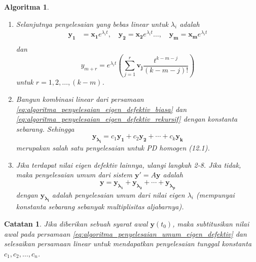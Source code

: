 \documentclass[a4paper]{article}
\theoremstyle{definisi}
\newtheorem{algoritma}{Algoritma}[section]
\newtheorem{catatan}{Catatan}[section]
\numberwithin{equation}{section}
\begin{document}
\begin{algoritma}
\begin{enumerate}[label=Langkah \arabic*: ,leftmargin=*]
    \item Selanjutnya penyelesaian yang bebas linear untuk $\lambda_i$ adalah
    \begin{equation}\label{eq:algoritma_penyelesaian_eigen_defektiv_biasa}
      \begin{split}
        \mathbf{y_1}&=\mathbf{x_1}e^{\lambda_it},\quad \mathbf{y_2}=\mathbf{x_2}e^{\lambda_it}
        \dots,\quad\mathbf{y_{m}}=\mathbf{x_m}e^{\lambda_it}\\
      \end{split}
    \end{equation}
    dan
    \begin{equation}\label{eq:algoritma_penyelesaian_eigen_defektiv_rekursif}
      y_{m+r}=e^{\lambda_it}\left(\sum_{j=1}^{r} \mathbf{v_{j}}\frac{t^{k-m-j}}{(k-m-j)!}\right)
    \end{equation}
    untuk $r=1,2,\ldots,(k-m)$.
    \item Bangun kombinasi linear dari persamaan \eqref{eq:algoritma_penyelesaian_eigen_defektiv_biasa} dan \eqref{eq:algoritma_penyelesaian_eigen_defektiv_rekursif} dengan konstanta sebarang. Sehingga
    \begin{equation*}
      \mathbf{y_{\lambda_i}}=c_1\mathbf{y_1}+c_2\mathbf{y_2}+\cdots+c_{k}\mathbf{y_{k}}
    \end{equation*}
    merupakan salah satu penyelesaian untuk PD homogen (12.1).
    \item Jika terdapat nilai eigen \textit{defektiv} lainnya, ulangi langkah 2-8. Jika tidak, maka penyelesaian umum dari sistem $\mathbf{y'}=A\mathbf{y}$ adalah
    \begin{equation}\label{eq:algoritma_penyelesaian_umum_eigen_defektiv}
      \mathbf{y}=\mathbf{y_{\lambda_1}}+\mathbf{y_{\lambda_2}}+\cdots+\mathbf{y_{\lambda_p}}
    \end{equation}
    dengan $\mathbf{y_{\lambda_i}}$ adalah penyelesaian umum dari nilai eigen $\lambda_i$ (mempunyai konstanta sebarang sebanyak multiplisitas aljabarnya).
  \end{enumerate}
  \end{algoritma}
    
  \begin{catatan}
    Jika diberikan sebuah syarat awal $\mathbf{y}(t_0)$, maka subtitusikan nilai awal pada persamaan \eqref{eq:algoritma_penyelesaian_umum_eigen_defektiv} dan selesaikan persamaan linear untuk mendapatkan penyelesaian tunggal konstanta $c_1,c_2,\ldots,c_n$. 
  \end{catatan}
\end{document}
